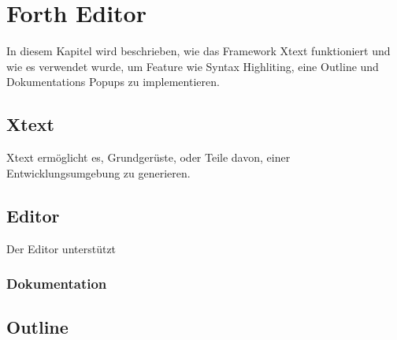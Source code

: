 \chapter{Forth Editor}
\label{chap:fortheditor}
In diesem Kapitel wird beschrieben, wie das Framework Xtext funktioniert und wie es verwendet wurde, um Feature wie Syntax Highliting, eine Outline und Dokumentations Popups zu implementieren.

\section{Xtext}
Xtext ermöglicht es, Grundgerüste, oder Teile davon, einer Entwicklungsumgebung zu generieren.

\section{Editor}
Der Editor unterstützt

\subsection{Dokumentation}

\section{Outline}

